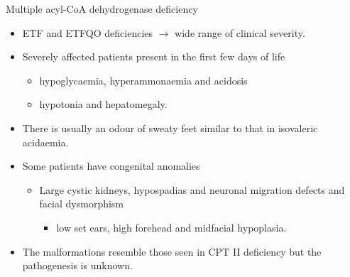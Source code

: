 \documentclass[presentation, smaller]{beamer}
\begin{document}
\begin{frame}[label={sec:orgheadline40}]{Multiple acyl-CoA dehydrogenase deficiency}
\begin{itemize}
\item ETF and ETFQO deficiencies \(\to\) wide range of clinical severity.
\item Severely affected patients present in the first few days of life
\begin{itemize}
\item hypoglycaemia, hyperammonaemia and acidosis
\item hypotonia and hepatomegaly.
\end{itemize}
\item There is usually an odour of sweaty feet similar to that in isovaleric acidaemia.
\item Some patients have congenital anomalies
\begin{itemize}
\item Large cystic kidneys, hypospadias and neuronal migration defects and facial dysmorphism
\begin{itemize}
\item low set ears, high forehead and midfacial hypoplasia.
\end{itemize}
\end{itemize}
\item The malformations resemble those seen in CPT II deficiency but the pathogenesis is unknown.
\end{itemize}
\end{frame}
\end{document}
